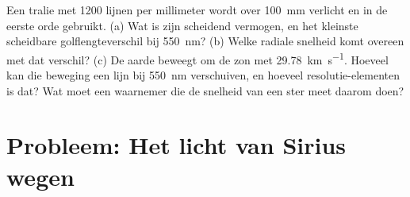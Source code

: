 \begin{exercise}[$\star\star\star$]\label{exo:b1:observing-the-sky:12}
Een tralie met 1200 lijnen per millimeter wordt over \qty{100}{mm} verlicht en in de eerste orde
gebruikt. (a) Wat is zijn scheidend vermogen, en het kleinste scheidbare golflengteverschil bij
\qty{550}{nm}? (b) Welke radiale snelheid komt overeen met dat verschil? (c) De aarde beweegt om
de zon met \qty{29.78}{km.s^{-1}}. Hoeveel kan die beweging een lijn bij \qty{550}{nm}
verschuiven, en hoeveel resolutie-elementen is dat? Wat moet een waarnemer die de snelheid van een
ster meet daarom doen?
\end{exercise}

\section{Probleem: Het licht van Sirius wegen}

